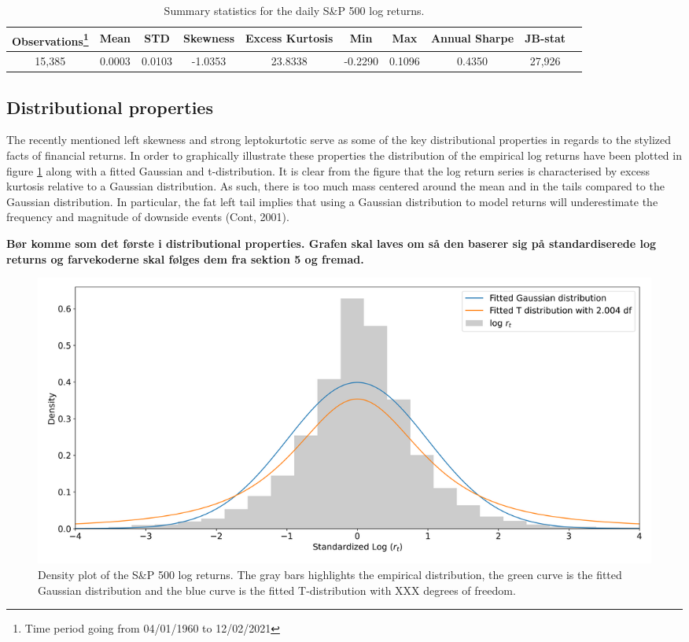 \begin{table}[H]
\small
\caption{Summary statistics for the daily S\&P 500 log returns.}
\centering
\begin{tabular}{c c c c c c c c c c} 
\hline\hline
Observations\footnote{Time period going from 04/01/1960 to 12/02/2021} & Mean & STD & Skewness & Excess Kurtosis & Min & Max & Annual Sharpe & JB-stat \\
\hline
15,385 & 0.0003 & 0.0103 & -1.0353 & 23.8338 & -0.2290 & 0.1096 & 0.4350 & 27,926 \\
\hline
\end{tabular}
\label{tab:summary_stats_S&P500}
\end{table}
 

\subsection{Distributional properties} 
The recently mentioned left skewness and strong leptokurtotic serve as some of the key distributional properties in regards to the stylized facts of financial returns. In order to graphically illustrate these properties the distribution of the empirical log returns have been plotted in figure \ref{fig: Kernel_distributions} along with a fitted Gaussian and t-distribution. It is clear from the figure that the log return series is characterised by excess kurtosis relative to a Gaussian distribution. As such, there is too much mass centered around the mean and in the tails compared to the Gaussian distribution. In particular, the fat left tail implies that using a Gaussian distribution to model returns will underestimate the frequency and magnitude of downside events (Cont, 2001). 

\textbf{Bør komme som det første i distributional properties. Grafen skal laves om så den baserer sig på standardiserede log returns og farvekoderne skal følges dem fra sektion 5 og fremad.}
\begin{figure}[H] 
    \centering
    \includegraphics[width=1\textwidth]{analysis/data_description/images/SP500_distribution.png}
    \caption[Density plot of the S\&P 500 log returns] {Density plot of the S\&P 500 log returns. The gray bars highlights the empirical distribution, the green curve is the fitted Gaussian distribution and the blue curve is the fitted T-distribution with XXX degrees of freedom.}
    \label{fig: Kernel_distributions}
\end{figure}


